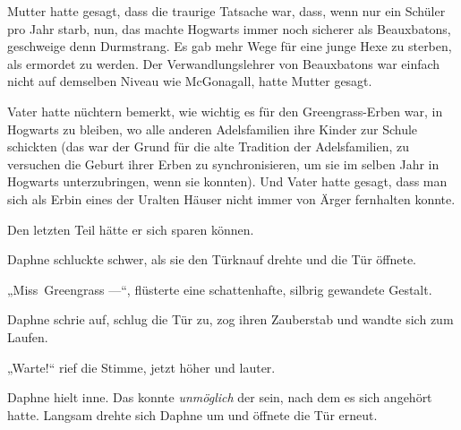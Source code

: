 Mutter hatte gesagt, dass die traurige Tatsache war, dass, wenn nur ein Schüler pro Jahr starb, nun, das machte Hogwarts immer noch sicherer als Beauxbatons, geschweige denn Durmstrang. Es gab mehr Wege für eine junge Hexe zu sterben, als ermordet zu werden. Der Verwandlungslehrer von Beauxbatons war einfach nicht auf demselben Niveau wie McGonagall, hatte Mutter gesagt.

Vater hatte nüchtern bemerkt, wie wichtig es für den Greengrass-Erben war, in Hogwarts zu bleiben, wo alle anderen Adelsfamilien ihre Kinder zur Schule schickten (das war der Grund für die alte Tradition der Adelsfamilien, zu versuchen die Geburt ihrer Erben zu synchronisieren, um sie im selben Jahr in Hogwarts unterzubringen, wenn sie konnten). Und Vater hatte gesagt, dass man sich als Erbin eines der Uralten Häuser nicht immer von Ärger fernhalten konnte.

Den letzten Teil hätte er sich sparen können.

Daphne schluckte schwer, als sie den Türknauf drehte und die Tür öffnete.

„Miss~Greengrass —“, flüsterte eine schattenhafte, silbrig gewandete Gestalt.

Daphne schrie auf, schlug die Tür zu, zog ihren Zauberstab und wandte sich zum Laufen.

„Warte!“ rief die Stimme, jetzt höher und lauter.

Daphne hielt inne. Das konnte \emph{unmöglich} der sein, nach dem es sich angehört hatte.
Langsam drehte sich Daphne um und öffnete die Tür erneut.

